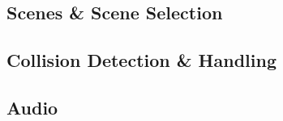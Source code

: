 \documentclass[11pt]{article}
\begin{document}
\subsection{Scenes \& Scene Selection}

\subsection{Collision Detection \& Handling}

\subsection{Audio}





\end{document}
